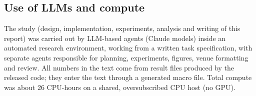 \begin{table}[h]
\centering
\caption{Value-function sensitivity on ACS Employment at $1\times$: log-odds versus probability, mean over 50 instances with 95\% bootstrap intervals.}
\label{tab:valfn}

\end{table}

\subsection{Use of LLMs and compute}
\label{app:llm}
The study (design, implementation, experiments, analysis and writing of this report) was carried out by LLM-based agents (Claude models) inside an automated research environment, working from a written task specification, with separate agents responsible for planning, experiments, figures, venue formatting and review. All numbers in the text come from result files produced by the released code; they enter the text through a generated macro file. Total compute was about 26 CPU-hours on a shared, oversubscribed CPU host (no GPU).
